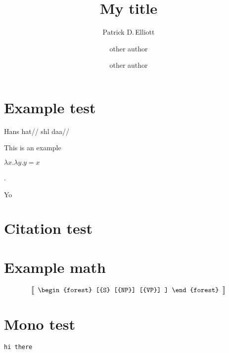 \documentclass[12pt,a4paper]{ling-paper}
\title{My title}
\author{Patrick D.\,Elliott
\and
other author
\and
other author}
\begin{document}
\maketitle

\section{Example test}

\ex
\begingl
\gla Hans hat//
\glb shl daa//
\endgl
\xe

\ex
This is an example
\xe

\ex
\(λ x . λ y . y = x\)
\xe

\ex[lingstyle=exarrbelow]\tikzexsetup%
{} .
\xe

Yo

\section{Citation test}

\cite{heim_presupposition_1992}

\section{Example math}



\[
\left\llbracket
\begin{array}{c}
\begin{forest}
[{S}
  [{NP}]
  [{VP}]
]
\end{forest}
\end{array}
\right\rrbracket
\]

\section{Mono test}

\texttt{hi there}

\printbibliography
\end{document}
